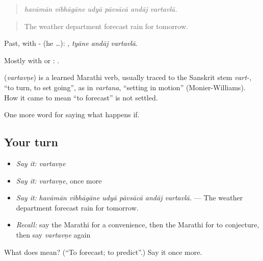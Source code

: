 \begin{quote}
\emph{havāmān vibhāgāne udyā pāvsācā andāj vartavlā.}
\end{quote}

\begin{quote}
The weather department forecast rain for tomorrow.
\end{quote}

Past, with - (he …):   , \emph{tyāne andāj vartavlā}.

Mostly with  or :  .

\begin{cousinweb}
\textbf{} (\emph{vartavṇe}) is a learned Marathi verb, usually traced to the Sanskrit stem \emph{vart-}, \textquotedblleft{}to turn, to set going\textquotedblright{}, as in \emph{vartana}, \textquotedblleft{}setting in motion\textquotedblright{} (Monier-Williams). How it came to mean \textquotedblleft{}to forecast\textquotedblright{} is not settled.
\end{cousinweb}

\begin{grammarlens}[title={What you've built}]
One more word for saying what happens if.
\end{grammarlens}

\subsection*{Your turn}
\begin{itemize}
\raggedright
  \item \emph{Say it:} \emph{vartavṇe}
  \item \emph{Say it:} \emph{vartavṇe}, once more
  \item \emph{Say it:} \emph{havāmān vibhāgāne udyā pāvsācā andāj vartavlā.} — The weather department forecast rain for tomorrow.
  \item \emph{Recall:} say the Marathi for a convenience, then the Marathi for to conjecture, then say \emph{vartavṇe} again
\end{itemize}

\begin{tcolorbox}[breakable,colback=teal!4,colframe=teal!35!black,title={Before you move on}]
What does  mean? (\textquotedblleft{}To forecast; to predict\textquotedblright{}.) Say it once more.
\end{tcolorbox}
